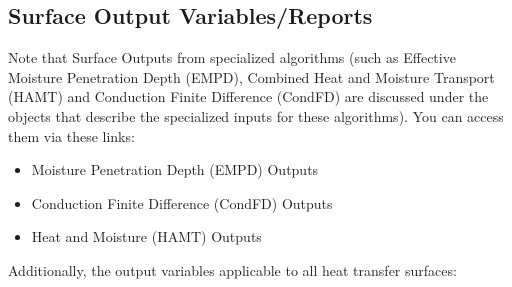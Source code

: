 \subsection{Surface Output Variables/Reports}\label{surface-output-variablesreports}

Note that Surface Outputs from specialized algorithms (such as Effective Moisture Penetration Depth (EMPD), Combined Heat and Moisture Transport (HAMT) and Conduction Finite Difference (CondFD) are discussed under the objects that describe the specialized inputs for these algorithms). You can access them via these links:

\begin{itemize}
\tightlist
\item
  Moisture Penetration Depth (EMPD) Outputs
\item
  Conduction Finite Difference (CondFD) Outputs
\item
  Heat and Moisture (HAMT) Outputs
\end{itemize}

Additionally, the output variables applicable to all heat transfer surfaces:

